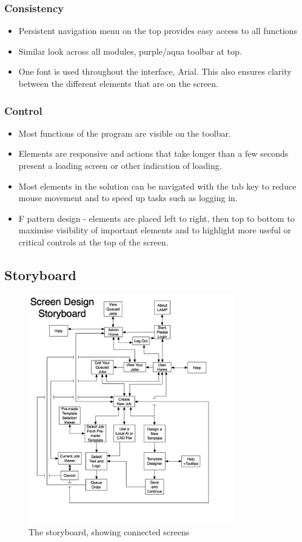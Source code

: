 \documentclass[oneside,openany,11pt,a4paper]{report}
\begin{document}
\subsubsection{Consistency}
\begin{itemize}
	\itemsep0em
	\item Persistent navigation menu on the top provides easy access to all functions
	\item Similar look across all modules, purple/aqua toolbar at top.
	\item One font is used throughout the interface, Arial. This also ensures clarity between the different elements that are on the screen.
\end{itemize}

\subsubsection{Control}
\begin{itemize}
	\itemsep0em
	\item Most functions of the program are visible on the toolbar.
	\item Elements are responsive and actions that take longer than a few seconds present a loading screen or other indication of loading.
	\item Most elements in the solution can be navigated with the tab key to reduce mouse movement and to speed up tasks such as logging in.
	\item F pattern design - elements are placed left to right, then top to bottom to maximise visibility of important elements and to highlight more useful or critical controls at the top of the screen.
\end{itemize}

\centering
\subsection{Storyboard}
\begin{figure}[H]
\includegraphics[width=0.8\textwidth]{storyboard.png}
\caption{The storyboard, showing connected screens}
\end{figure}
\end{document}
